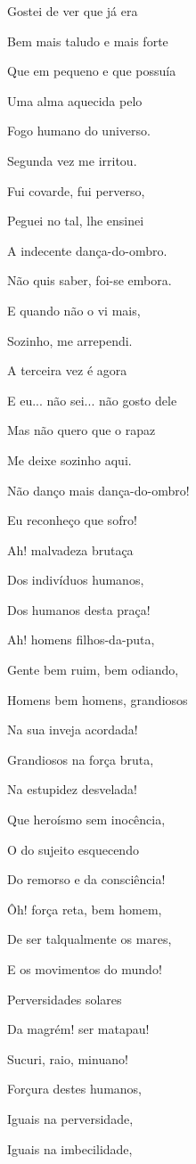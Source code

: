 Gostei de ver que já era

Bem mais taludo e mais forte

Que em pequeno e que possuía

Uma alma aquecida pelo

Fogo humano do universo.

Segunda vez me irritou.

Fui covarde, fui perverso,

Peguei no tal, lhe ensinei

A indecente dança-do-ombro.

Não quis saber, foi-se embora.

E quando não o vi mais,

Sozinho, me arrependi.

A terceira vez é agora

E eu... não sei... não gosto dele

Mas não quero que o rapaz

Me deixe sozinho aqui.

Não danço mais dança-do-ombro!

Eu reconheço que sofro!

Ah! malvadeza brutaça

Dos indivíduos humanos,

Dos humanos desta praça!

Ah! homens filhos-da-puta,

Gente bem ruim, bem odiando,

Homens bem homens, grandiosos

Na sua inveja acordada!

Grandiosos na força bruta,

Na estupidez desvelada!

Que heroísmo sem inocência,

O do sujeito esquecendo

Do remorso e da consciência!

Ôh! força reta, bem homem,

De ser talqualmente os mares,

E os movimentos do mundo!

Perversidades solares

Da magrém! ser matapau!

Sucuri, raio, minuano!

Forçura destes humanos,

Iguais na perversidade,

Iguais na imbecilidade,

